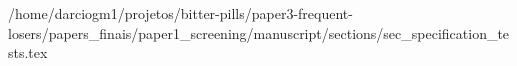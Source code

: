 /home/darciogm1/projetos/bitter-pills/paper3-frequent-losers/papers_finais/paper1_screening/manuscript/sections/sec_specification_tests.tex